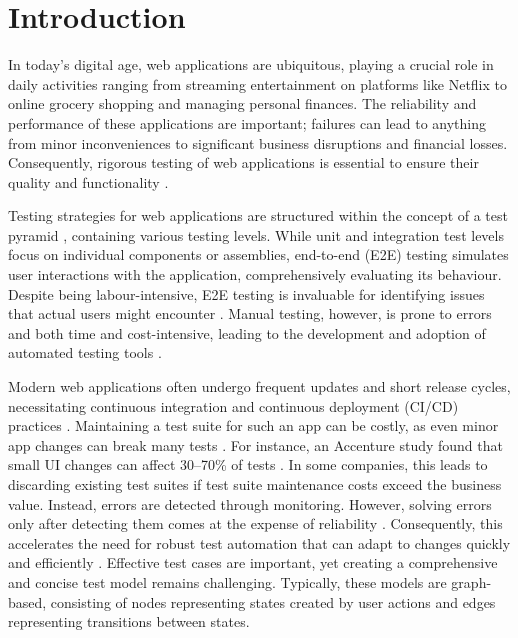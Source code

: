 \section{Introduction}
\label{sec:intro}

In today's digital age, web applications are ubiquitous, playing a crucial role in daily activities ranging from streaming entertainment on platforms like Netflix to online grocery shopping and managing personal finances. The reliability and performance of these applications are important; failures can lead to anything from minor inconveniences to significant business disruptions and financial losses. Consequently, rigorous testing of web applications is essential to ensure their quality and functionality \cite{ricca_chapter_2019}.

Testing strategies for web applications are structured within the concept of a test pyramid \cite{cohn_forgotten_nodate}, containing various testing levels. While unit and integration test levels focus on individual components or assemblies, end-to-end (E2E) testing simulates user interactions with the application, comprehensively evaluating its behaviour. Despite being labour-intensive, E2E testing is invaluable for identifying issues that actual users might encounter \cite{ricca_chapter_2019}. Manual testing, however, is prone to errors and both time and cost-intensive, leading to the development and adoption of automated testing tools \cite{holmes_automating_2006}. 

Modern web applications often undergo frequent updates and short release cycles, necessitating continuous integration and continuous deployment (CI/CD) practices \cite{gupta_prevalence_2022}. Maintaining a test suite for such an app can be costly, as even minor app changes can break many tests \cite{christophe_prevalence_2014}. For instance, an Accenture study found that small UI changes can affect 30–70\% of tests \cite{grechanik_maintaining_2009}. In some companies, this leads to discarding existing test suites if test suite maintenance costs exceed the business value. Instead, errors are detected through monitoring. However, solving errors only after detecting them comes at the expense of reliability \cite{colin_zalando_2024}. Consequently, this accelerates the need for robust test automation that can adapt to changes quickly and efficiently \cite{grechanik_maintaining_2009}. Effective test cases are important, yet creating a comprehensive and concise test model remains challenging. Typically, these models are graph-based, consisting of nodes representing states created by user actions and edges representing transitions between states.

